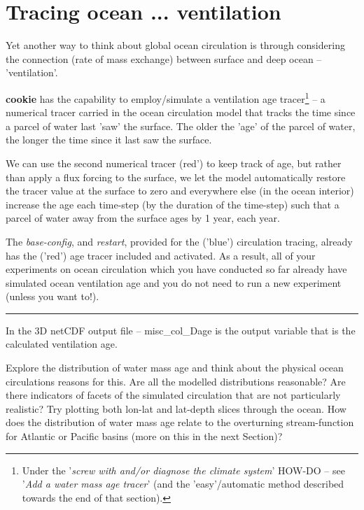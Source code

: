 \section{Tracing ocean ... ventilation}

Yet another way to think about global ocean circulation is through considering the connection (rate of mass exchange) between surface and deep ocean -- 'ventilation'.

\textbf{cookie} has the capability to employ/simulate a ventilation age tracer\footnote{Under the '\textit{screw with and/or diagnose the climate system}' HOW-DO -- see '\textit{Add a water mass age tracer}' (and the 'easy'/automatic method described towards the end of that section).} -- a numerical tracer carried in the ocean circulation model that tracks the time since a parcel of water last 'saw' the surface. The older the 'age' of the parcel of water, the longer the time since it last saw the surface.

We can use the second numerical tracer (red') to keep track of age, but rather than apply a flux forcing to the surface, we let the model automatically restore the tracer value at the surface to zero and everywhere else (in the ocean interior) increase the age each time-step (by the duration of the time-step) such that a parcel of water away from the surface ages by 1 year, each year.

The \textit{base-config}, and \textit{restart}, provided for the ('blue') circulation tracing, already has the ('red') age tracer included and activated. As a result, all of your experiments on ocean circulation which you have conducted so far already have simulated ocean ventilation age and you do not need to run a new experiment (unless you want to!).

\vspace{1mm}\noindent\rule{4cm}{0.5pt}\vspace{2mm}

\noindent In the 3D netCDF output file -- \textsf{\footnotesize misc\_col\_Dage} is the output variable that is the calculated ventilation age.

Explore the distribution of water mass age and think about the physical ocean circulations reasons for this. Are all the modelled distributions reasonable? Are there indicators of facets of the simulated circulation that are not particularly realistic? Try plotting both lon-lat and lat-depth slices through the ocean. How does the distribution of water mass age relate to the overturning stream-function for Atlantic or Pacific basins (more on this in the next Section)?


